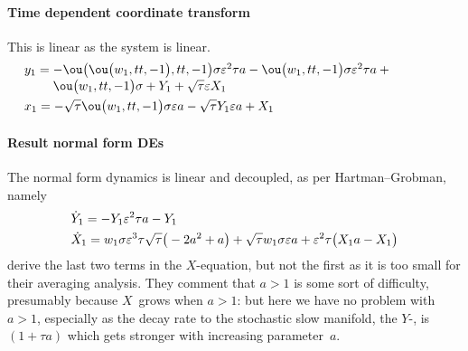 \paragraph{Time dependent coordinate transform}  This is linear as the system is linear.
\begin{align*}&
y_{1}=\ParMath{-\ou\big(\ou\big(w_{1},tt,-1\big),tt,-1\big) \sigma  \eps^{2} 
\tau  a-\ou\big(w_{1},tt,-1\big) \sigma  \eps^{2} \tau  a+\ou\big(w_{1},
tt,-1\big) \sigma +Y_{1}+\sqrt {\tau } \eps X_{1}
}
\\&
x_{1}=-\sqrt {\tau } \ou\big(w_{1},tt,-1\big) \sigma  \eps a-\sqrt {
\tau } Y_{1} \eps a+X_{1}
\end{align*}

\paragraph{Result normal form DEs}
The normal form dynamics is linear and decoupled, as per Hartman--Grobman, namely
\begin{align*}&
\dot Y_{1}=-Y_{1} \varepsilon^{2} \tau  a-Y_{1}
\\&
\dot X_{1}=w_{1} \sigma  \varepsilon^{3} \tau\sqrt {\tau }  \big(-2 a^{2}+
 a\big)+\sqrt {\tau } w_{1} \sigma  \varepsilon a+\varepsilon^{2} \tau  
\big(X_{1} a-X_{1}\big)
\end{align*}
\cite{Monahan2011} derive the last two terms in the $X$-equation, but not the first as it is too small for their averaging analysis.
They comment that $a>1$ is some sort of difficulty, presumably because \(X\)~grows when \(a>1\): but here we have no problem with $a>1$, especially as the decay rate to the stochastic slow manifold, the $Y$-\sde, is $(1+\tau a)$ which gets stronger with increasing parameter~$a$.


